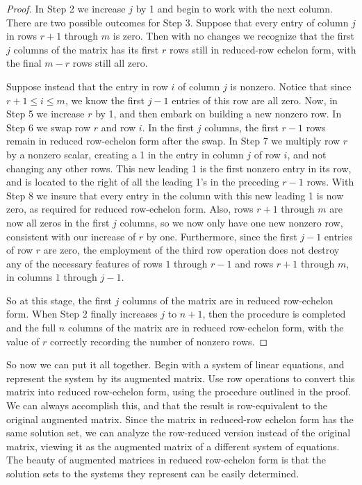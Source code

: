 \documentclass{ximera}
\begin{document}
\begin{theorem}
\begin{proof}
In Step 2 we increase $j$ by 1 and begin to work with the next column.
There are two possible outcomes for Step 3.  Suppose that every entry
of column $j$ in rows $r+1$ through $m$ is zero.  Then with no changes
we recognize that the first $j$ columns of the matrix has its first
$r$ rows still in reduced-row echelon form, with the final $m-r$ rows
still all zero.

Suppose instead that the entry in row $i$ of column $j$ is nonzero.
Notice that since $r+1\leq i\leq m$, we know the first $j-1$ entries
of this row are all zero.  Now, in Step 5 we increase $r$ by 1, and
then embark on building a new nonzero row.  In Step 6 we swap row $r$
and row $i$.  In the first $j$ columns, the first $r-1$ rows remain in
reduced row-echelon form after the swap.  In Step 7 we multiply row
$r$ by a nonzero scalar, creating a 1 in the entry in column $j$ of
row $i$, and not changing any other rows.  This new leading 1 is the
first nonzero entry in its row, and is located to the right of all the
leading 1's in the preceding $r-1$ rows.  With Step 8 we insure that
every entry in the column with this new leading 1 is now zero, as
required for reduced row-echelon form.  Also, rows $r+1$ through $m$
are now all zeros in the first $j$ columns, so we now only have one
new nonzero row, consistent with our increase of $r$ by one.
Furthermore, since the first $j-1$ entries of row $r$ are zero, the
employment of the third row operation does not destroy any of the
necessary features of rows $1$ through $r-1$ and rows $r+1$ through
$m$, in columns $1$ through $j-1$.

So at this stage, the first $j$ columns of the matrix are in reduced
row-echelon form.  When Step 2 finally increases $j$ to $n+1$, then
the procedure is completed and the full $n$ columns of the matrix are
in reduced row-echelon form, with the value of $r$ correctly recording
the number of nonzero rows.
\end{proof}
\end{theorem}

So now we can put it all together.  Begin with a system of linear
equations, and represent the system by its augmented matrix.  Use row
operations to convert this matrix into reduced row-echelon form, using
the procedure outlined in the proof.  We can always accomplish this,
and that the result is row-equivalent to the original augmented
matrix.  Since the matrix in reduced-row echelon form has the same
solution set, we can analyze the row-reduced version instead of the
original matrix, viewing it as the augmented matrix of a different
system of equations.  The beauty of augmented matrices in reduced
row-echelon form is that the solution sets to the systems they
represent can be easily determined.
\end{document}
